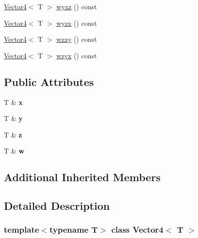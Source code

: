 \begin{DoxyCompactItemize}
\item 
\mbox{\hyperlink{class_vector4}{Vector4}}$<$ T $>$ \mbox{\hyperlink{class_vector4_a4dd8131d29f2bd26cb67d37f1b61aa01}{wyxz}} () const
\item 
\mbox{\hyperlink{class_vector4}{Vector4}}$<$ T $>$ \mbox{\hyperlink{class_vector4_af51ae6f93e2c05deb16ddd69be0b56bd}{wyzx}} () const
\item 
\mbox{\hyperlink{class_vector4}{Vector4}}$<$ T $>$ \mbox{\hyperlink{class_vector4_aa519a7a86891dcee0b7129c1d47df891}{wzxy}} () const
\item 
\mbox{\hyperlink{class_vector4}{Vector4}}$<$ T $>$ \mbox{\hyperlink{class_vector4_a18b606df692b9f081c544c0c061863fc}{wzyx}} () const
\end{DoxyCompactItemize}
\subsection*{Public Attributes}
\begin{DoxyCompactItemize}
\item 
\mbox{\label{class_vector4_adcc1731c8a9a16a7c1940c220e1e8132}} 
T \& {\bfseries x}
\item 
\mbox{\label{class_vector4_ae1d43ae639c141bd8371c8645b7d3750}} 
T \& {\bfseries y}
\item 
\mbox{\label{class_vector4_a2d540eb8e3a5db046aaa541f3c95bef3}} 
T \& {\bfseries z}
\item 
\mbox{\label{class_vector4_a8d62c21fea973b478c253b3b9d3aaa50}} 
T \& {\bfseries w}
\end{DoxyCompactItemize}
\subsection*{Additional Inherited Members}


\subsection{Detailed Description}
\subsubsection*{template$<$typename T$>$\newline
class Vector4$<$ T $>$}

